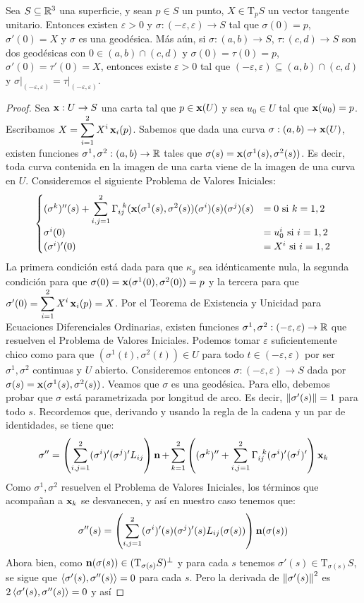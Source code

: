 \begin{prop}
Sea $S\subseteq\mathbb{R}^3$ una superficie, y sean $p\in S$ un punto, $X\in\mathrm{T}_pS$ un vector tangente unitario. Entonces existen $\varepsilon>0$ y $\sigma:(-\varepsilon,\varepsilon)\to S$ tal que $\sigma(0)=p$, $\sigma'(0)=X$ y $\sigma$ es una geodésica. Más aún, si $\sigma:(a,b)\to S$, $\tau:(c,d)\to S$ son dos geodésicas con $0\in (a,b)\cap (c,d)$ y $\sigma(0)=\tau(0)=p$, $\sigma'(0)=\tau'(0)=X$, entonces existe $\varepsilon>0$ tal que $(-\varepsilon,\varepsilon)\subseteq (a,b)\cap (c,d)$ y $\left.\sigma\right\rvert_{(-\varepsilon,\varepsilon)}=\left.\tau\right\rvert_{(-\varepsilon,\varepsilon)}$.
\begin{proof}
Sea $\operatorname{\mathbf{x}}:U\to S$ una carta tal que $p\in\operatorname{\mathbf{x}}(U)$ y sea $u_0\in U$ tal que $\operatorname{\mathbf{x}}(u_0)=p$. Escribamos $X=\displaystyle\sum_{i=1}^2 X^i \operatorname{\mathbf{x}}_i(p)$. Sabemos que dada una curva $\sigma:(a,b)\to \operatorname{\mathbf{x}}(U)$, existen funciones $\sigma^1,\sigma^2:(a,b)\to\mathbb{R}$ tales que $\sigma(s)=\operatorname{\mathbf{x}}(\sigma^1(s),\sigma^2(s))$. Es decir, toda curva contenida en la imagen de una carta viene de la imagen de una curva en $U$. Consideremos el siguiente Problema de Valores Iniciales: $$\begin{cases}(\sigma^k)''(s) + \displaystyle\sum_{i,j=1}^2 \Gamma_{ij}^{\;\;k}(\operatorname{\mathbf{x}}(\sigma^1(s),\sigma^2(s))(\sigma^i)(s)(\sigma^j)(s) &= 0 \text{ si }k=1,2\\ \sigma^i(0)&=u_0^i \text{ si }i=1,2\\ (\sigma^i)'(0)&=X^i \text{ si }i=1,2\end{cases}$$ La primera condición está dada para que $\kappa_g$ sea idénticamente nula, la segunda condición para que $\sigma(0)=\operatorname{\mathbf{x}}(\sigma^1(0),\sigma^2(0)) = p$ y la tercera para que $\sigma'(0)=\displaystyle\sum_{i=1}^2 X^i \operatorname{\mathbf{x}}_i(p)=X$. Por el Teorema de Existencia y Unicidad para Ecuaciones Diferenciales Ordinarias, existen funciones $\sigma^1,\sigma^2:(-\varepsilon,\varepsilon)\to\mathbb{R}$ que resuelven el Problema de Valores Iniciales. Podemos tomar $\varepsilon$ suficientemente chico como para que $(\sigma^1(t),\sigma^2(t))\in U$ para todo $t\in(-\varepsilon,\varepsilon)$ por ser $\sigma^1,\sigma^2$ continuas y $U$ abierto. Consideremos entonces $\sigma:(-\varepsilon,\varepsilon)\to S$ dada por $\sigma(s)=\operatorname{\mathbf{x}}(\sigma^1(s),\sigma^2(s))$. Veamos que $\sigma$ es una geodésica. Para ello, debemos probar que $\sigma$ está parametrizada por longitud de arco. Es decir, $\left\| \sigma'(s) \right\|=1$ para todo $s$. Recordemos que, derivando y usando la regla de la cadena y un par de identidades, se tiene que: $$\sigma''=\left(\displaystyle\sum_{i,j=1}^2 (\sigma^i)'(\sigma^j)'L_{ij}\right)\operatorname{\mathbf{n}} + \displaystyle\sum_{k=1}^2 \left((\sigma^k)'' + \displaystyle\sum_{i,j=1}^2 \Gamma_{ij}^{\;\;k}(\sigma^i)'(\sigma^j)'\right)\operatorname{\mathbf{x}}_k$$ Como $\sigma^1,\sigma^2$ resuelven el Problema de Valores Iniciales, los términos que acompañan a $\operatorname{\mathbf{x}}_k$ se desvanecen, y así en nuestro caso tenemos que: $$\sigma''(s)=\left(\displaystyle\sum_{i,j=1}^2 (\sigma^i)'(s)(\sigma^j)'(s)L_{ij}(\sigma(s))\right)\operatorname{\mathbf{n}}(\sigma(s))$$ Ahora bien, como $\operatorname{\mathbf{n}}(\sigma(s))\in(\mathrm{T}_{\sigma(s)}S)^\perp$ y para cada $s$ tenemos $\sigma'(s)\in\mathrm{T}_{\sigma(s)}S$, se sigue que $\left\langle \sigma'(s),\sigma''(s) \right\rangle=0$ para cada $s$. Pero la derivada de $\left\| \sigma'(s) \right\|^2$ es $2\left\langle \sigma'(s),\sigma''(s) \right\rangle=0$ y así 
\end{proof}
\end{prop}
